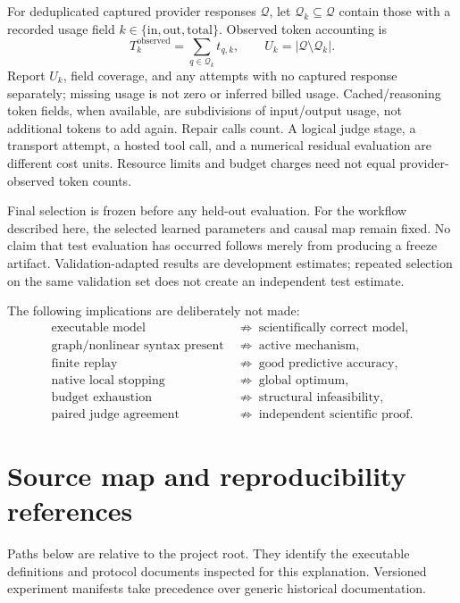 \documentclass[11pt]{article}
\begin{document}
For deduplicated captured provider responses $\mathcal Q$, let
$\mathcal Q_k\subseteq\mathcal Q$ contain those with a recorded usage field
$k\in\{\mathrm{in},\mathrm{out},\mathrm{total}\}$. Observed token accounting is
\begin{equation}
 T_k^{\mathrm{observed}}=\sum_{q\in\mathcal Q_k}t_{q,k},\qquad
 U_k=|\mathcal Q\setminus\mathcal Q_k|.
\end{equation}
Report $U_k$, field coverage, and any attempts with no captured response
separately; missing usage is not zero or inferred billed usage.
Cached/reasoning token fields, when available, are subdivisions of input/output
usage, not additional tokens to add again. Repair calls count. A logical judge
stage, a transport attempt, a hosted tool call, and a numerical residual evaluation
are different cost units. Resource limits and budget charges need not equal
provider-observed token counts.

Final selection is frozen before any held-out evaluation. For the workflow
described here, the selected learned parameters and causal map remain fixed.
No claim that test evaluation has occurred follows merely from producing a
freeze artifact. Validation-adapted results are development estimates; repeated
selection on the same validation set does not create an independent test estimate.

The following implications are deliberately not made:
\begin{align*}
 \text{executable model}&\ \not\Rightarrow\ \text{scientifically correct model},\\
 \text{graph/nonlinear syntax present}&\ \not\Rightarrow\ \text{active mechanism},\\
 \text{finite replay}&\ \not\Rightarrow\ \text{good predictive accuracy},\\
 \text{native local stopping}&\ \not\Rightarrow\ \text{global optimum},\\
 \text{budget exhaustion}&\ \not\Rightarrow\ \text{structural infeasibility},\\
 \text{paired judge agreement}&\ \not\Rightarrow\ \text{independent scientific proof}.
\end{align*}

\appendix
\section{Source map and reproducibility references}
\label{sec:sources}

Paths below are relative to the project root. They identify the executable
definitions and protocol documents inspected for this explanation. Versioned
experiment manifests take precedence over generic historical documentation.
\end{document}
